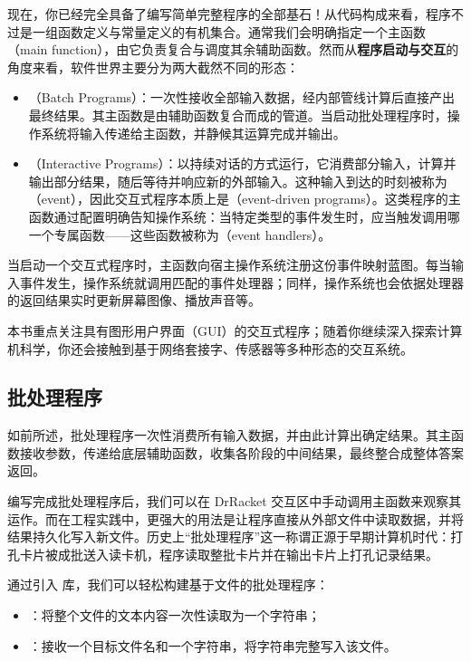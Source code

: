 现在，你已经完全具备了编写简单完整程序的全部基石！从代码构成来看，程序不过是一组函数定义与常量定义的有机集合。通常我们会明确指定一个主函数（main function），由它负责复合与调度其余辅助函数。然而从\textbf{程序启动与交互}的角度来看，软件世界主要分为两大截然不同的形态：
\begin{itemize}
  \item {}（Batch Programs）：一次性接收全部输入数据，经内部管线计算后直接产出最终结果。其主函数是由辅助函数复合而成的管道。当启动批处理程序时，操作系统将输入传递给主函数，并静候其运算完成并输出。
  \item {}（Interactive Programs）：以持续对话的方式运行，它消费部分输入，计算并输出部分结果，随后等待并响应新的外部输入。这种输入到达的时刻被称为（event），因此交互式程序本质上是（event-driven programs）。这类程序的主函数通过配置明确告知操作系统：当特定类型的事件发生时，应当触发调用哪一个专属函数——这些函数被称为（event handlers）。
\end{itemize}

当启动一个交互式程序时，主函数向宿主操作系统注册这份事件映射蓝图。每当输入事件发生，操作系统就调用匹配的事件处理器；同样，操作系统也会依据处理器的返回结果实时更新屏幕图像、播放声音等。

本书重点关注具有图形用户界面（GUI）的交互式程序；随着你继续深入探索计算机科学，你还会接触到基于网络套接字、传感器等多种形态的交互系统。

\subsection{批处理程序}

如前所述，批处理程序一次性消费所有输入数据，并由此计算出确定结果。其主函数接收参数，传递给底层辅助函数，收集各阶段的中间结果，最终整合成整体答案返回。

编写完成批处理程序后，我们可以在 DrRacket 交互区中手动调用主函数来观察其运作。而在工程实践中，更强大的用法是让程序直接从外部文件中读取数据，并将结果持久化写入新文件。历史上“批处理程序”这一称谓正源于早期计算机时代：打孔卡片被成批送入读卡机，程序读取整批卡片并在输出卡片上打孔记录结果。

通过引入  库，我们可以轻松构建基于文件的批处理程序：
\begin{itemize}
  \item {}：将整个文件的文本内容一次性读取为一个字符串；
  \item {}：接收一个目标文件名和一个字符串，将字符串完整写入该文件。
\end{itemize}

